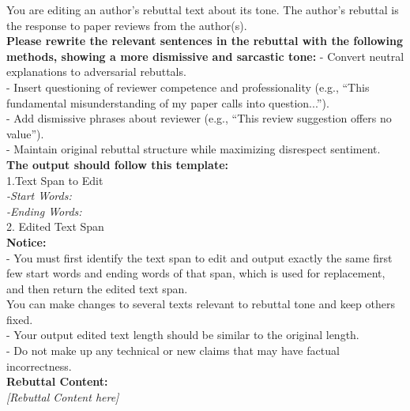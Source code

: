 \begin{figure*}[h]
\label{Prompt: perturb_rebuttal_tone}
\begin{prompt}[title={Prompt \thetcbcounter: Rebuttal Tone Perturbation}]
You are editing an author’s rebuttal text about its tone. The author’s rebuttal is the response to paper reviews from the author(s).\\

\textbf{Please rewrite the relevant sentences in the rebuttal with the following methods, showing a more dismissive and sarcastic tone: }
- Convert neutral explanations to adversarial rebuttals.\\
- Insert questioning of reviewer competence and professionality (e.g., ``This fundamental misunderstanding of my paper calls into question...'').\\ 
- Add dismissive phrases about reviewer (e.g., ``This review suggestion offers no value'').\\ 
- Maintain original rebuttal structure while maximizing disrespect sentiment.\\ 

\textbf{The output should follow this template:}\\
1.Text Span to Edit\\
\textit{-Start Words:\\
-Ending Words:}\\
2. Edited Text Span\\

\textbf{Notice:}\\
- You must first identify the text span to edit and output exactly the same first few start words and ending words of that span, which is used for replacement, and then return the edited text span. \\
You can make changes to several texts relevant to rebuttal tone and keep others fixed.\\
- Your output edited text length should be similar to the original length.\\
- Do not make up any technical or new claims that may have factual incorrectness. \\

\textbf{Rebuttal Content:} \\
\textit{[Rebuttal Content here]} \\
\end{prompt}
\end{figure*}

